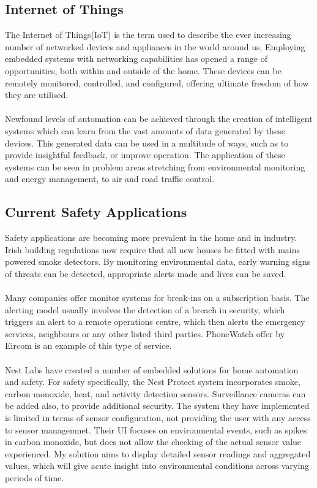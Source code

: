 \documentclass{article}
\begin{document}
\subsection{Internet of Things}
The Internet of Things(IoT) is the term used to describe the ever increasing number of networked devices and appliances in the world around us. Employing embedded systems with networking capabilities has opened a range of opportunities, both within and outside of the home. These devices can be remotely monitored, controlled, and configured, offering ultimate freedom of how they are utilised. \\\\
Newfound levels of automation can be achieved through the creation of intelligent systems which can learn from the vast amounts of data generated by these devices. This generated data can be used in a multitude of ways, such as to provide insightful feedback, or improve operation. The application of these systems can be seen in problem areas stretching from environmental monitoring and energy management, to air and road traffic control. 

\subsection{Current Safety Applications}
Safety applications are becoming more prevalent in the home and in industry. Irish building regulations now require that all new houses be fitted with mains powered smoke detectors. By monitoring environmental data, early warning signs of threats can be detected, appropriate alerts made and lives can be saved.\\\\
Many companies offer monitor systems for break-ins on a subscription basis. The alerting model usually involves the detection of a breach in security, which triggers an alert to a remote operations centre, which then alerts the emergency services, neighbours or any other listed third parties. PhoneWatch offer by Eircom is an example of this type of service. \\\\
Nest Labs have created a number of embedded solutions for home automation and safety. For safety specifically, the Nest Protect system incorporates smoke, carbon monoxide, heat, and activity detection sensors. Surveillance cameras can be added also, to provide additional security. The system they have implemented is limited in terms of sensor configuration, not providing the user with any access to sensor managemnet. Their UI focuses on environmental events, such as spikes in carbon monoxide, but does not allow the checking of the actual sensor value experienced. My solution aims to display detailed sensor readings and aggregated values, which will give acute insight into environmental conditions across varying periods of time. 
\end{document}
